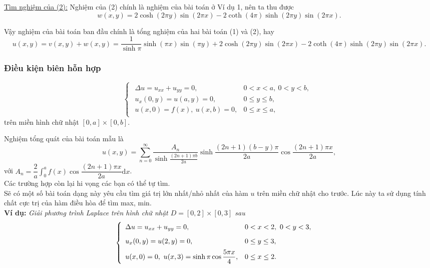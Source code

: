 \documentclass[10pt, a4paper]{article}
\begin{document}
	\underline{Tìm nghiệm của (2):} Nghiệm của (2) chính là nghiệm của bài toán ở Ví dụ 1, nên ta thu được $$w(x,y)=2\cosh(2\pi y)\sin(2\pi x)-2\coth(4\pi)\sinh(2\pi y)\sin(2\pi x).$$
	
	Vậy nghiệm của bài toán ban đầu chính là tổng nghiệm của hai bài toán (1) và (2), hay $$u(x,y)=v(x,y)+w(x,y)=\frac{1}{\sinh\pi}\sinh(\pi x)\sin(\pi y)+2\cosh(2\pi y)\sin(2\pi x)-2\coth(4\pi)\sinh(2\pi y)\sin(2\pi x).$$
	\subsubsection{Điều kiện biên hỗn hợp}
	\vspace{2mm}
	\begin{tcolorbox}[enhanced,colback=blue!5!white,colframe=blue!75!black,sharp corners=all,shadow={0mm}{0mm}{-1.5mm}%
		{fill=blue!75!red,opacity=0.3},title=\textbf{Một dạng mẫu của bài toán}]
		$$\begin{cases}
			\begin{array}{ll}
				\Delta u=u_{xx}+u_{yy}=0, & 0<x<a,~0<y<b,\\
				u_x(0,y)=u(a,y)=0, & 0\le y\le b,\\
				u(x,0)=f(x),~u(x,b)=0, & 0\le x\le a,
			\end{array}
		\end{cases}$$
		trên miền hình chữ nhật $[0,a]\times[0,b]$.
	\end{tcolorbox}
	\vspace{2mm}
	Nghiệm tổng quát của bài toán mẫu là $$u(x,y)=\displaystyle\sum_{n=0}^\infty\dfrac{A_n}{\sinh\frac{(2n+1)\pi b}{2a}}\sinh\dfrac{(2n+1)(b-y)\pi}{2a}\cos\dfrac{(2n+1)\pi x}{2a},$$
	với $A_n=\dfrac2a\displaystyle\int_0^af(x)\cos\dfrac{(2n+1)\pi x}{2a}\text{d}x$.\\
	
	Các trường hợp còn lại hi vọng các bạn có thể tự tìm.\\
	
	Sẽ có một số bài toán dạng này yêu cầu tìm giá trị lớn nhất/nhỏ nhất của hàm $u$ trên miền chữ nhật cho trước. Lúc này ta sử dụng tính chất cực trị của hàm điều hòa để tìm max, min.\\
	
	\textbf{Ví dụ:} \textit{Giải phương trình Laplace trên hình chữ nhật $D=[0,2]\times[0,3]$ sau} $$\begin{cases}
		\begin{array}{ll}
			\Delta u=u_{xx}+u_{yy}=0, & 0<x<2,~0<y<3,\\
			\noalign{\vskip6pt}
			u_x(0,y)=u(2,y)=0, & 0\le y\le 3,\\
			\noalign{\vskip5pt}
			u(x,0)=0,~u(x,3)=\sinh\pi\cos\dfrac{5\pi x}{4}, & 0\le x\le 2.
		\end{array}
	\end{cases}$$
	
\end{document}
